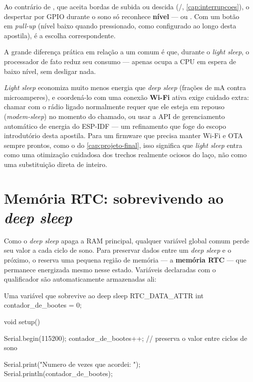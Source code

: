 \begin{nota}
Ao contrário de , que aceita bordas de subida ou descida (/, \cref{cap:interrupcoes}), o despertar por GPIO durante o sono só reconhece \textbf{nível} —  ou . Com um botão em \emph{pull-up} (nível baixo quando pressionado, como configurado ao longo desta apostila),  é a escolha correspondente.
\end{nota}

A grande diferença prática em relação a um  comum é que, durante o \emph{light sleep}, o processador de fato reduz seu consumo —  apenas ocupa a CPU em espera de baixo nível, sem desligar nada.

\begin{atencao}
\emph{Light sleep} economiza muito menos energia que \emph{deep sleep} (frações de mA contra microamperes), e coordená-lo com uma conexão \textbf{Wi-Fi} ativa exige cuidado extra: chamar  com o rádio ligado normalmente requer que ele esteja em repouso (\emph{modem-sleep}) no momento do chamado, ou usar a API de gerenciamento automático de energia do ESP-IDF — um refinamento que foge do escopo introdutório desta apostila. Para um firmware que precisa manter Wi-Fi e OTA sempre prontos, como o do \cref{cap:projeto-final}, isso significa que \emph{light sleep} entra como uma otimização cuidadosa dos trechos realmente ociosos do laço, não como uma substituição direta de  inteiro.
\end{atencao}

\section{Memória RTC: sobrevivendo ao \emph{deep sleep}}

Como o \emph{deep sleep} apaga a RAM principal, qualquer variável global comum perde seu valor a cada ciclo de sono. Para preservar dados entre um \emph{deep sleep} e o próximo, o \ESP{} reserva uma pequena região de memória — a \textbf{memória RTC} — que permanece energizada mesmo nesse estado. Variáveis declaradas com o qualificador  são automaticamente armazenadas ali:

\begin{codigoc}{Uma variável que sobrevive ao deep sleep}
RTC_DATA_ATTR int contador_de_bootes = 0;

void setup() {
    Serial.begin(115200);
    contador_de_bootes++;   // preserva o valor entre ciclos de sono

    Serial.print("Numero de vezes que acordei: ");
    Serial.println(contador_de_bootes);
}
\end{codigoc}

